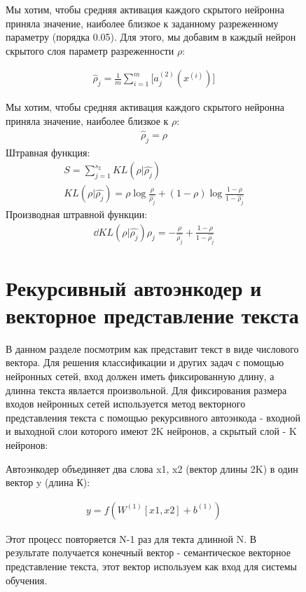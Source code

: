 \documentclass[12pt]{article}
\begin{document}
\begin{figure}[h]
Мы хотим, чтобы средняя активация каждого скрытого нейронна приняла значение, наиболее близкое к заданному разреженному параметру (порядка 0.05). Для этого, мы добавим в каждый нейрон скрытого слоя параметр разреженности $\rho$:

  \begin{align}
	\hat \rho_j=\frac{1}{m}\sum_{i=1}^m\biggl[a^{(2)}_j(x^{(i)})\biggl]
  \end{align}

  Мы хотим, чтобы средняя активация каждого скрытого нейронна приняла значение, наиболее близкое к $\rho$:
  \begin{align}
	\hat \rho_j=\rho
  \end{align}
  Штравная функция:
  \begin{align}
	S=\sum_{j=1}^{s_2}{KL({\rho}|{\hat{\rho_j}})}\\
	KL({\rho}|{\hat{\rho_j}})=\rho\log{\frac{\rho}{\hat{\rho_j}}}+(1-\rho)\log{\frac{1-\rho}{1-\hat{\rho_j}}}
  \end{align}
  Производная штравной функции:
  \begin{align}
	\dd{KL({\rho}|{\hat{\rho_j}})}{\rho_j}=-\frac{\rho}{\hat{\rho_j}} + \frac{1-\rho}{1-\hat{\rho_j}}
  \end{align}

\section{Рекурсивный автоэнкодер и векторное представление текста}

В данном разделе посмотрим как представит текст в виде числового вектора. Для решения классификации и других задач с помощью нейронных сетей, вход должен иметь фиксированную длину, а длинна текста явлается произвольной. Для фиксирования размера входов нейронных сетей используется метод векторного представления текста с помощью рекурсивного автоэнкода - входной и выходной слои которого имеют 2K нейронов, а скрытый слой - K нейронов: 

Автоэнкодер объединяет два слова x1, x2 (вектор длины 2K) в один вектор y (длина К):

  \begin{align}
	y=f{(W^{(1)}[x1, x2] + b^{(1)})}
  \end{align}

Этот процесс повторяется N-1 раз для текта длинной N. В результате получается конечный вектор - семантическое векторное представление текста, этот вектор используем как вход для системы обучения.


\end{figure}
\end{document}
